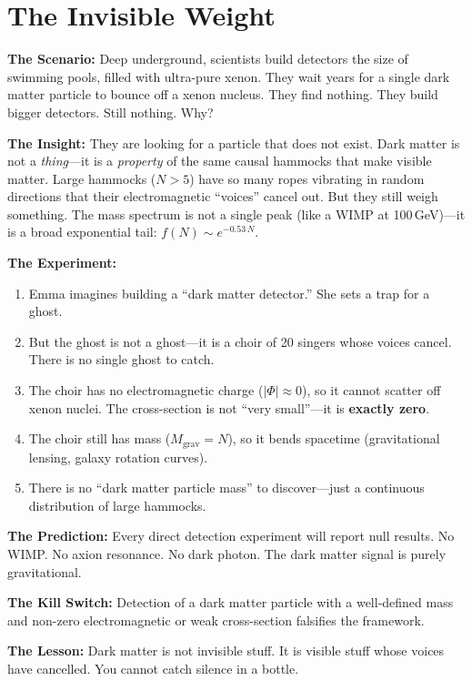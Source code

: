 \documentclass[11pt, a4paper, openany]{book}
\begin{document}
\section{The Invisible Weight}
\begin{thoughtexp}
\textbf{The Scenario:} Deep underground, scientists build detectors the size of swimming pools, filled with ultra-pure xenon. They wait years for a single dark matter particle to bounce off a xenon nucleus. They find nothing. They build bigger detectors. Still nothing. Why?

\textbf{The Insight:} They are looking for a particle that does not exist. Dark matter is not a \emph{thing}---it is a \emph{property} of the same causal hammocks that make visible matter. Large hammocks ($N > 5$) have so many ropes vibrating in random directions that their electromagnetic ``voices'' cancel out. But they still weigh something. The mass spectrum is not a single peak (like a WIMP at 100\,GeV)---it is a broad exponential tail: $f(N) \sim e^{-0.53\,N}$.

\textbf{The Experiment:}
\begin{enumerate}
  \item Emma imagines building a ``dark matter detector.'' She sets a trap for a ghost.
  \item But the ghost is not a ghost---it is a choir of 20 singers whose voices cancel. There is no single ghost to catch.
  \item The choir has no electromagnetic charge ($|\Phi| \approx 0$), so it cannot scatter off xenon nuclei. The cross-section is not ``very small''---it is \textbf{exactly zero}.
  \item The choir still has mass ($M_{\text{grav}} = N$), so it bends spacetime (gravitational lensing, galaxy rotation curves).
  \item There is no ``dark matter particle mass'' to discover---just a continuous distribution of large hammocks.
\end{enumerate}

\textbf{The Prediction:} Every direct detection experiment will report null results. No WIMP. No axion resonance. No dark photon. The dark matter signal is purely gravitational.

\textbf{The Kill Switch:} Detection of a dark matter particle with a well-defined mass and non-zero electromagnetic or weak cross-section falsifies the framework.

\textbf{The Lesson:} Dark matter is not invisible stuff. It is visible stuff whose voices have cancelled. You cannot catch silence in a bottle.
\end{thoughtexp}
\end{document}
